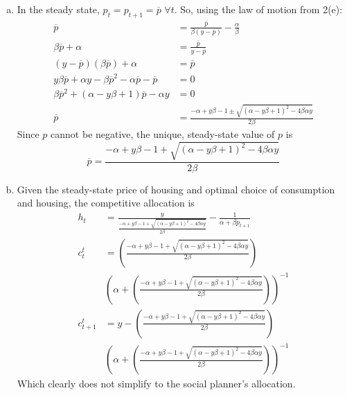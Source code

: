 \documentclass{article}
\newcommand{\olp}{\overline{p}}
\begin{document}
\begin{enumerate}
\begin{enumerate}[(a)]
			\item In the steady state, $p_t = p_{t+1}=\overline{p}$ $\forall t$. So, using the law of motion from 2(e):
				\begin{align*}
					\olp &= \frac{\olp}{\beta(y-\olp)} - \frac{\alpha}{\beta}	\\
					\beta\olp + \alpha &= \frac{\olp}{y-\olp}	\\
					(y-\olp)(\beta\olp) + \alpha &= \olp	\\
					y\beta\olp + \alpha y - \beta\olp^2-\alpha\olp - \olp &= 0	\\
					\beta\olp^2 + (\alpha-y\beta + 1)\olp - \alpha y &= 0		\\
					\olp &= \frac{-\alpha+y\beta - 1 \pm\sqrt{(\alpha-y\beta + 1)^2-4\beta\alpha y}}{2\beta}
				\end{align*}
				Since $p$ cannot be negative, the unique, steady-state value of $p$ is
				\[
					\olp = \frac{-\alpha+y\beta - 1 +\sqrt{(\alpha-y\beta + 1)^2-4\beta\alpha y}}{2\beta}
				\]
				
			\item Given the steady-state price of housing and optimal choice of consumption and housing, the competitive allocation is
				\begin{align*}
					h_t		&= \frac{y}{\frac{-\alpha+y\beta - 1 +\sqrt{(\alpha-y\beta + 1)^2-4\beta\alpha y}}{2\beta}} - \frac{1}{\alpha + \beta p_{t+1}}	\\
					c_t^t &= \left(\frac{-\alpha+y\beta - 1 +\sqrt{(\alpha-y\beta + 1)^2-4\beta\alpha y}}{2\beta}\right)	\\
									&\left(\alpha + \left(\frac{-\alpha+y\beta - 1 +\sqrt{(\alpha-y\beta + 1)^2-4\beta\alpha y}}{2\beta}\right)\right)^{-1} \\
					c_{t+1}^t &=  y - \left(\frac{-\alpha+y\beta - 1 +\sqrt{(\alpha-y\beta + 1)^2-4\beta\alpha y}}{2\beta}\right)	\\
									&\left(\alpha + \left(\frac{-\alpha+y\beta - 1 +\sqrt{(\alpha-y\beta + 1)^2-4\beta\alpha y}}{2\beta}\right)\right)^{-1}
				\end{align*}
				Which clearly does not simplify to the social planner's allocation.
		\end{enumerate}

\end{enumerate}


\end{document}
